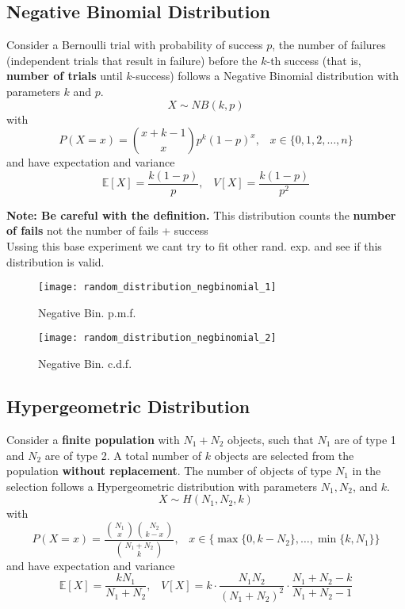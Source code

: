 \subsection{Negative Binomial Distribution}
Consider a Bernoulli trial with probability of success $p$, the number of
failures (independent trials that result in failure) before the $k$-th success
(that is, \textbf{number of trials} until $k$-success) follows a Negative
Binomial distribution with parameters $k$ and $p$.
\[ X \sim NB(k,p)\] with
\[ P(X=x) = \binom{x+k-1}{x} p^k(1-p)^x,\;\;\; x \in \{0,1,2,\dots,n\} \] and
have expectation and variance
\[ \mathbb{E}[X] = \frac{k(1-p)}{p},\;\;\; V[X] = \frac{k(1-p)}{p^2} \]

\textbf{Note: Be careful with the definition.} This distribution counts the
\textbf{number of fails} not the number of fails + success\\
 Ussing this base
experiment we cant try to fit other rand. exp. and see if this distribution is
valid.
\begin{figure}[!ht]
    \begin{minipage}{0.45\linewidth}
      \texttt{[image: random\_distribution\_negbinomial\_1]}
      \caption{Negative Bin. p.m.f.}
    \end{minipage}
    \hfill
    \begin{minipage}{0.45\linewidth}
      \texttt{[image: random\_distribution\_negbinomial\_2]}
      \caption{Negative Bin. c.d.f.}
    \end{minipage}
\end{figure}

\subsection{Hypergeometric Distribution}
Consider a \textbf{finite population} with $N_1+N_2$ objects, such that $N_1$
are of type 1 and $N_2$ are of type 2. A total number of $k$ objects are
selected from the population \textbf{without replacement}. The number of objects
of type $N_1$ in the selection follows a Hypergeometric distribution with
parameters $N_1, N_2$, and $k$.
\[ X \sim H(N_1,N_2,k)\] with
\[ P(X=x) = \frac{\binom{N_1}{x}\binom{N_2}{k-x}}{\binom{N_1+N_2}{k}},\;\;\; x
\in \{\max\{0,k-N_2\},\dots,\min\{k,N_1\} \} \] and have expectation and
variance
\[ \mathbb{E}[X] = \frac{kN_1}{N_1+N_2},\;\;\; V[X] =
k\cdot\frac{N_1N_2}{(N_1+N_2)^2}\cdot\frac{N_1+N_2-k}{N_1+N_2-1} \]

